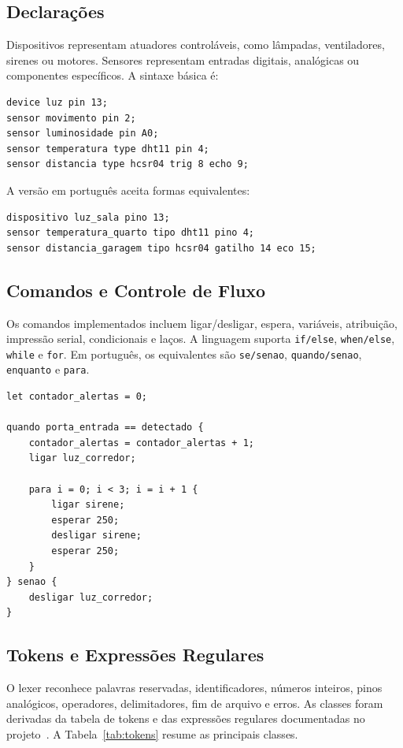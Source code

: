 \documentclass[conference]{IEEEtran}
\begin{document}
\subsection{Declarações}
Dispositivos representam atuadores controláveis, como lâmpadas, ventiladores, sirenes ou motores. Sensores representam entradas digitais, analógicas ou componentes específicos. A sintaxe básica é:

\begin{lstlisting}[style=homescript]
device luz pin 13;
sensor movimento pin 2;
sensor luminosidade pin A0;
sensor temperatura type dht11 pin 4;
sensor distancia type hcsr04 trig 8 echo 9;
\end{lstlisting}

A versão em português aceita formas equivalentes:

\begin{lstlisting}[style=homescript]
dispositivo luz_sala pino 13;
sensor temperatura_quarto tipo dht11 pino 4;
sensor distancia_garagem tipo hcsr04 gatilho 14 eco 15;
\end{lstlisting}

\subsection{Comandos e Controle de Fluxo}
Os comandos implementados incluem ligar/desligar, espera, variáveis, atribuição, impressão serial, condicionais e laços. A linguagem suporta \texttt{if/else}, \texttt{when/else}, \texttt{while} e \texttt{for}. Em português, os equivalentes são \texttt{se/senao}, \texttt{quando/senao}, \texttt{enquanto} e \texttt{para}.

\begin{lstlisting}[style=homescript,caption={Trecho de automação residencial completa.},label={lst:complete}]
let contador_alertas = 0;

quando porta_entrada == detectado {
    contador_alertas = contador_alertas + 1;
    ligar luz_corredor;

    para i = 0; i < 3; i = i + 1 {
        ligar sirene;
        esperar 250;
        desligar sirene;
        esperar 250;
    }
} senao {
    desligar luz_corredor;
}
\end{lstlisting}

\subsection{Tokens e Expressões Regulares}
O lexer reconhece palavras reservadas, identificadores, números inteiros, pinos analógicos, operadores, delimitadores, fim de arquivo e erros. As classes foram derivadas da tabela de tokens e das expressões regulares documentadas no projeto~\cite{docs-tokens}. A Tabela~\ref{tab:tokens} resume as principais classes.
\end{document}

